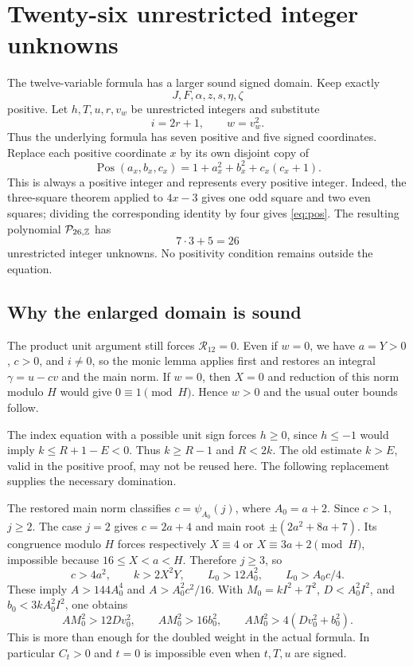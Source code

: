 \documentclass[11pt,letterpaper]{article}
\theoremstyle{remark}\newtheorem{remark}[theorem]{Remark}
\newcommand{\Z}{\mathbb Z}\newcommand{\N}{\mathbb N}\newcommand{\pos}{\mathbb Z_{>0}}
\begin{document}
\section{Twenty-six unrestricted integer unknowns}\label{sec:integers}

The twelve-variable formula has a larger sound signed domain. Keep exactly
\[
 J,F,\alpha,z,s,\eta,\zeta
\]
positive. Let $h,T,u,r,v_w$ be unrestricted integers and substitute
\begin{equation}\label{eq:signedsub}
 i=2r+1,\qquad w=v_w^2.
\end{equation}
Thus the underlying formula has seven positive and five signed coordinates.
Replace each positive coordinate $x$ by its own disjoint copy of
\begin{equation}\label{eq:pos}
 \operatorname{Pos}(a_x,b_x,c_x)=1+a_x^2+b_x^2+c_x(c_x+1).
\end{equation}
This is always a positive integer and represents every positive integer.
Indeed, the three-square theorem applied to $4x-3$ gives one odd square and
two even squares; dividing the corresponding identity by four gives
\eqref{eq:pos}. The resulting polynomial $\PS_{26,\Z}$ has
\[
 \boxed{7\cdot3+5=26}
\]
unrestricted integer unknowns. No positivity condition remains outside the equation.

\subsection{Why the enlarged domain is sound}
The product unit argument still forces $\mathcal R_{12}=0$. Even if $w=0$,
we have $a=Y>0$, $c>0$, and $i\ne0$, so the monic lemma applies first and
restores an integral $\gamma=u-cv$ and the main norm. If $w=0$, then
$X=0$ and reduction of this norm modulo $H$ would give $0\equiv1\pmod H$.
Hence $w>0$ and the usual outer bounds follow.

The index equation with a possible unit sign forces $h\geq0$, since
$h\leq-1$ would imply $k\leq R+1-E<0$. Thus $k\geq R-1$ and $R<2k$.
The old estimate $k>E$, valid in the positive proof, may not be reused here.
The following replacement supplies the necessary domination.

The restored main norm classifies $c=\psi_{A_0}(j)$, where $A_0=a+2$.
Since $c>1$, $j\geq2$. The case $j=2$ gives $c=2a+4$ and main root
$\pm(2a^2+8a+7)$. Its congruence modulo $H$ forces respectively
$X\equiv4$ or $X\equiv3a+2\pmod H$, impossible because $16\leq X<a<H$.
Therefore $j\geq3$, so
\[
 c>4a^2,\qquad k>2X^2Y,
 \qquad L_0>12A_0^2,\qquad L_0>A_0c/4.
\]
These imply $A>144A_0^4$ and $A>A_0^2c^2/16$. With
$M_0=kI^2+T^2$, $D<A_0^2I^2$, and $b_0<3kA_0^2I^2$, one obtains
\[
 AM_0^2>12Dv_0^2,\qquad AM_0^2>16b_0^2,
 \qquad AM_0^2>4(Dv_0^2+b_0^2).
\]
This is more than enough for the doubled weight in the actual formula.
In particular $C_t>0$ and $t=0$ is impossible even when $t,T,u$ are signed.
\end{document}
